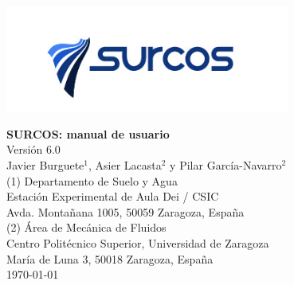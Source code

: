 \documentclass[11pt, twoside, openany, a4paper]{book}
\begin{document}

\nocite{*}

\renewcommand{\tablename}{Tabla}
\renewcommand{\listtablename}{Índice de tablas}
\renewcommand{\bibname}{Bibliografía}

\pagestyle{empty}

\begin{titlepage} 
\begin{center} 
 
\includegraphics*[height=3.5cm]{images/logo_surcos.png} 

\vspace*{3.5cm} 
{\Huge \textbf{SURCOS: manual de usuario\\}}
\vspace*{1cm} 
{\normalsize Versión 6.0}\\
\vspace*{1cm} 
{\Large Javier Burguete$^1$, Asier Lacasta$^2$ y Pilar García-Navarro$^2$}\\ 
\vspace*{2.5cm} 
{\normalsize (1) Departamento de Suelo y Agua}\\
{Estación Experimental de Aula Dei / CSIC}\\ 
{Avda. Montañana 1005, 50059 Zaragoza, España}\\ 
\vspace*{1cm} 
{\normalsize (2) Área de Mecánica de Fluidos}\\ 
{Centro Politécnico Superior, Universidad de Zaragoza}\\
{María de Luna 3, 50018 Zaragoza, España}\\
\vspace*{1cm} 
{\normalsize \today}\\ 
\end{center} 
\end{titlepage} 
\cleardoublepage

\pagestyle{plain}

\tableofcontents
\listoffigures

\cleardoublepage

\pagestyle{headings}


\cleardoublepage


\cleardoublepage


\cleardoublepage

%
\end{document}
